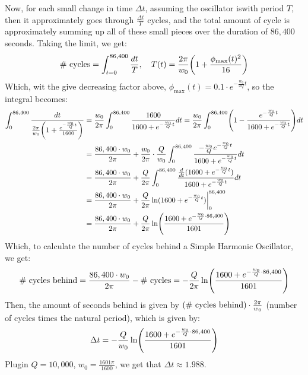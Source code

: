 \documentclass{article}
\DeclarePairedDelimiter{\paran}{(}{)}%
\begin{document}
Now, for each small change in time $\Delta t$, assuming the oscillator iswith period $T$, then it approximately goes through $\frac{\Delta t}{T}$ cycles, and the total amount of cycle is approximately summing up all of these small pieces over the duration of $86,400$ seconds. Taking the limit, we get:
\begin{align}
    \#\textmd{ cycles} = \int_{t=0}^{86,400}\frac{dt}{T},\quad T(t) = \frac{2\pi}{w_0}\paran*{1+\frac{\phi_{\max}(t)^2}{16}}
\end{align}
Which, wit the give decreasing factor above, $\phi_{\max}(t) = 0.1 \cdot e^{-\frac{w_0}{2Q}t}$, so the integral becomes:
\begin{align}
    \int_{0}^{86,400}\frac{dt}{\frac{2\pi}{w_0}\paran*{1+\frac{e^{-\frac{w_0}{Q}t}}{1600}}} &= \frac{w_0}{2\pi}\int_{0}^{86,400}\frac{1600}{1600+e^{-\frac{w_0}{Q}t}}dt = \frac{w_0}{2\pi}\int_{0}^{86,400}\paran*{1-\frac{e^{-\frac{w_0}{Q}t}}{1600+e^{-\frac{w_0}{Q}t}}}dt\\
    &= \frac{86,400\cdot w_0}{2\pi}+\frac{w_0}{2\pi}\cdot \frac{Q}{w_0}\int_{0}^{86,400}\frac{-\frac{w_0}{Q}e^{-\frac{w_0}{Q}t}}{1600+e^{-\frac{w_0}{Q}t}}dt\\
    &= \frac{86,400\cdot w_0}{2\pi}+\frac{Q}{2\pi}\int_{0}^{86,400}\frac{\frac{d}{dt}(1600+e^{-\frac{w_0}{Q}t})}{1600+e^{-\frac{w_0}{Q}t}}dt\\
    &= \frac{86,400\cdot w_0}{2\pi} + \frac{Q}{2\pi}\ln(1600+e^{-\frac{w_0}{Q}t})\bigg|_{0}^{86,400}\\
    &= \frac{86,400\cdot w_0}{2\pi} + \frac{Q}{2\pi}\ln\paran*{\frac{1600+e^{-\frac{w_0}{Q}\cdot 86,400}}{1601}}
\end{align}
Which, to calculate the number of cycles behind a Simple Harmonic Oscillator, we get:
\begin{align}
    \#\textmd{ cycles behind} = \frac{86,400\cdot w_0}{2\pi} - \#\textmd{ cycles} = -\frac{Q}{2\pi}\ln\paran*{\frac{1600+e^{-\frac{w_0}{Q}\cdot 86,400}}{1601}}
\end{align}
Then, the amount of seconds behind is given by $(\#\textmd{ cycles behind})\cdot \frac{2\pi}{w_0}$ (number of cycles times the natural period), which is given by:
\begin{align}
    \Delta t = -\frac{Q}{w_0}\ln\paran*{\frac{1600+e^{-\frac{w_0}{Q}\cdot 86,400}}{1601}}
\end{align}
Plugin $Q=10,000$, $w_0=\frac{1601\pi}{1600}$, we get that $\Delta t\approx 1.988$.

\break
\end{document}
